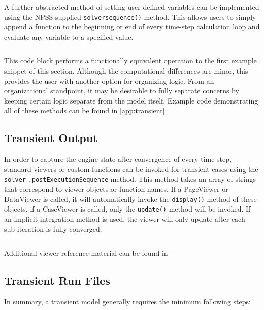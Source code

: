\documentclass[heading.tex]{subfiles}
\begin{document}
A further abstracted method of setting user defined variables can be implemented using the NPSS supplied 
\texttt{solversequence()} method.
This allows users to simply append a function to the beginning or end of every time-step calculation loop
and evaluate any variable to a specified value. 
 
 \begin{adjustwidth}{-1cm}{-1cm}
 \inputminted[]{c++}{code/solverSequence}
 \end{adjustwidth} 
 
This code block performs a functionally equivalent operation to the first example snippet of this section.
Although the computational differences are minor, this provides the user with another option for organizing logic.
From an organizational standpoint,
it may be desirable to fully separate concerns by keeping certain logic separate from the model itself.
Example code demonstrating all of these methods can be found in \cref{app:transient}.

\subsection{Transient Output}

In order to capture the engine state after convergence of every time step, standard viewers or custom functions can be
invoked for transient cases using the \texttt{solver} \texttt{.postExecutionSequence} method. This method takes an array of strings that
correspond to viewer objects or function names. If a PageViewer or DataViewer is called, it will automatically invoke the
\texttt{display()} method of these objects, if a CaseViewer is called, only the \texttt{update()} method will be invoked.
If an implicit integration method is used, the viewer will only update after each sub-iteration is fully converged.

 \begin{adjustwidth}{-1cm}{-1cm}
 \inputminted[]{c++}{code/transient1}
 \end{adjustwidth} 

Additional viewer reference material can be found in \cite[chap.~7.2.2, ~12, ~15.3.1]{NPSS}

\subsection{Transient Run Files}

In summary, a transient model generally requires the minimum following steps:
\end{document}
